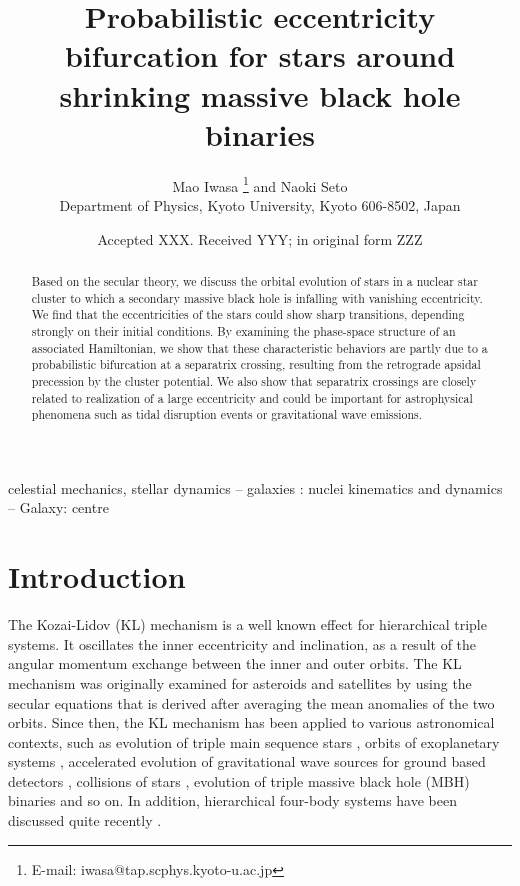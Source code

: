\documentclass[useAMS,usenatbib,twocolumn]{mn2e}
\title{
Probabilistic eccentricity  bifurcation  for  stars around shrinking massive black hole binaries}
\author[M. Iwasa and N. Seto ]{Mao Iwasa \thanks{E-mail:
iwasa@tap.scphys.kyoto-u.ac.jp}
 and Naoki Seto
\\
Department of Physics, Kyoto University, 
Kyoto 606-8502, Japan
}
\date{Accepted XXX. Received YYY; in original form ZZZ}
\newcommand{\add}[1]{\textcolor{red}{#1}}
\begin{document}
\maketitle
\begin{abstract}

Based on the secular theory, we discuss the orbital evolution of stars in a nuclear star cluster to which a secondary massive black hole is infalling with vanishing eccentricity.  We find that the eccentricities of the stars  could show sharp transitions, depending strongly on their initial conditions.   By examining the phase-space structure of an associated Hamiltonian,  we show that these characteristic behaviors are partly due to a probabilistic bifurcation at a separatrix crossing, resulting from the retrograde 
apsidal precession by the cluster potential.   We also show that  separatrix crossings are closely related to  realization of a large eccentricity and could be important for  astrophysical phenomena such as tidal disruption events or gravitational wave emissions.  



\end{abstract}

\begin{keywords}
celestial mechanics, stellar dynamics -- galaxies : nuclei 
kinematics and dynamics -- Galaxy: centre
\end{keywords}


\section{Introduction}
The Kozai-Lidov (KL) mechanism is a well known effect for hierarchical 
triple systems. It oscillates the inner eccentricity and inclination, as a result of the angular momentum exchange between the inner and outer orbits. The KL mechanism was originally examined for asteroids \citep{kozai1962} and satellites \citep{lidov1962} by using the secular equations that is derived after averaging the mean anomalies of the two orbits. Since then,  the KL mechanism has been applied to various astronomical contexts, such as evolution of triple main sequence stars \citep{ford2000,fabrycky2007,naoz2014,borkovits2016,toonen2016}, orbits of exoplanetary systems \citep{holman1997,ford2000,nagasawa2008,naoz2011,munoz2016}, accelerated evolution of gravitational wave sources for ground based detectors \citep{wen2003,antonini2012,seto2013,antognini2014,antonini2014,silsbee2016}, collisions of stars \citep{perets2009,katz2012,thompson2011,kushnir2013}, evolution of triple massive black hole (MBH) binaries \citep{blaes2002,hoffman2007,iwasawa2011} and so on.
In addition, hierarchical four-body systems have been discussed quite recently \citep{pejcha2013,hamers2016,hamers2017}. 
\end{document}
